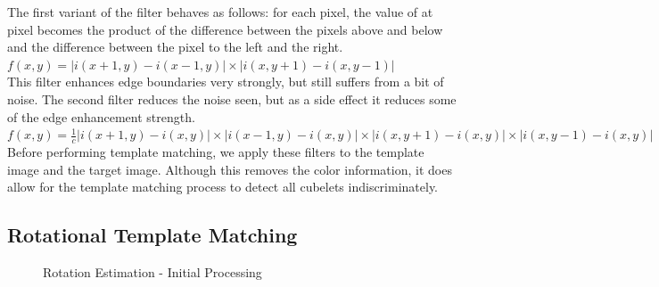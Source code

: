 \documentclass[conference]{IEEEtran}
\begin{document}
The first variant of the filter behaves as follows: for each pixel, the value of at pixel becomes the product of the difference between the pixels above and below and the difference between the pixel to the left and the right.
\\[6pt]
\begin{math} 
	f(x,y) = |i(x+1,y) - i(x-1,y)|  \times |i(x,y+1) - i(x,y-1)| 
\end{math} 
\\[6pt]
This filter enhances edge boundaries very strongly, but still suffers from a bit of noise. The second filter reduces the noise seen, but as a side effect it reduces some of the edge enhancement strength. 
\\[6pt]
\begin{math} 
	f(x,y) = \frac{1}{c} |i(x+1,y) - i(x,y)|  \times |i(x-1,y) - i(x,y)| \times |i(x,y+1) - i(x,y)| \times |i(x,y-1) - i(x,y)| 
\end{math} 
\\[6pt]

Before performing template matching, we apply these filters to the template image and the target image.  Although this removes the  color information, it does allow for the template matching process to detect all cubelets indiscriminately. 

\subsection{Rotational Template Matching}

\begin{figure}[!b]
\centerline{
\label{fig_first_case}
\hfil
{}}
\caption{Rotation Estimation - Initial Processing}
\label{fig_sim}
\end{figure}
\end{document}
